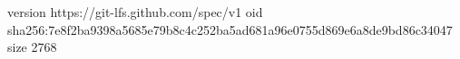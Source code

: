 version https://git-lfs.github.com/spec/v1
oid sha256:7e8f2ba9398a5685e79b8c4c252ba5ad681a96e0755d869e6a8de9bd86c34047
size 2768
